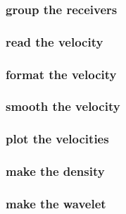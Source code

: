 \begin{frame} \frametitle{group the receivers}

\end{frame}
\cwpnote{}

\begin{frame} \frametitle{read the velocity}

\end{frame}
\cwpnote{}

\begin{frame} \frametitle{format the velocity}

\end{frame}
\cwpnote{}

\begin{frame} \frametitle{smooth the velocity}

\end{frame}
\cwpnote{}

\begin{frame} \frametitle{plot the velocities}

\end{frame}
\cwpnote{}

\begin{frame}  \end{frame}
\begin{frame}  \end{frame}

\begin{frame} \frametitle{make the density}

\end{frame}
\cwpnote{}

\begin{frame} \frametitle{make the wavelet}

\end{frame}
\cwpnote{}

\begin{frame}  \end{frame}

